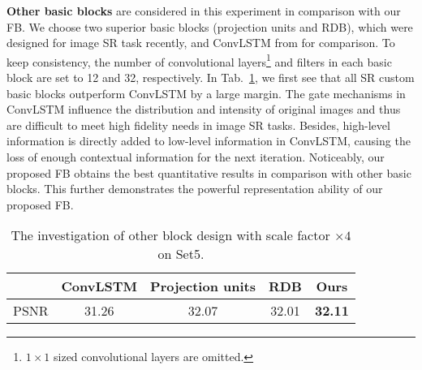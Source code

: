 \documentclass[10pt,twocolumn,letterpaper]{article}
\begin{document}
\textbf{Other basic blocks} are considered in this experiment in comparison with our FB. We choose two superior basic blocks (\ie projection units\cite{Haris_2018_CVPR} and RDB\cite{Zhang_2018_CVPR}), which were designed for image SR task recently, and ConvLSTM from \cite{Zamir_2017_CVPR} for comparison. To keep consistency, the number of convolutional layers\footnote{$1\times1$ sized convolutional layers are omitted.} and filters in each basic block are set to 12 and 32, respectively. In Tab.~\ref{block_design}, we first see that all SR custom basic blocks outperform ConvLSTM by a large margin. The gate mechanisms in ConvLSTM influence the distribution and intensity of original images and thus are difficult to meet high fidelity needs in image SR tasks. Besides, high-level information is directly added to low-level information in ConvLSTM, causing the loss of enough contextual information for the next iteration. Noticeably, our proposed FB obtains the best quantitative results in comparison with other basic blocks. This further demonstrates the powerful representation ability of our proposed FB. 

\begin{table*}[h]
	\begin{center}
		\begin{tabular}{|c|c|c|c|c|}
			\hline
    		 & ConvLSTM & Projection units  & RDB & Ours \\ \hline\hline
		PSNR &    31.26	      &    32.07   	       &   32.01	       &  \textbf{32.11}    \\ \hline
		\end{tabular}
		\medskip
		\caption{The investigation of other block design with scale factor $\times4$ on Set5.}
		\label{block_design}			
	\end{center}
\end{table*}
\end{document}
